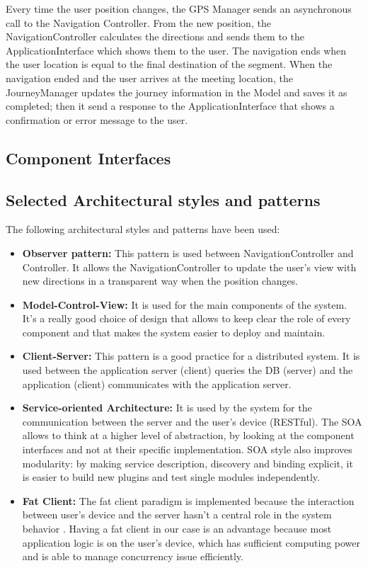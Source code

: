 Every time the user position changes, the GPS Manager sends an asynchronous call to the Navigation Controller.  From the new position, the NavigationController calculates the directions and sends them to the ApplicationInterface which shows them to the user. The navigation ends when the user location is equal to the final destination of the segment.
When the navigation ended and the user arrives at the meeting location, the JourneyManager updates the journey information in the Model and saves it as completed; then it send a response to the ApplicationInterface that shows a confirmation or error message to the user.


\clearpage
\subsection{Component Interfaces}

\clearpage
\subsection{Selected Architectural styles and patterns}
The following architectural styles and patterns have been used:
\begin{itemize}
\item
\textbf{Observer pattern:} This pattern is used between NavigationController and Controller. It allows the NavigationController to update the user’s view with new directions in a transparent way when the position changes.
\item
\textbf{Model-Control-View:} It is used for the main components of the system. It’s a really good choice of design that allows to keep clear the role of every component and that makes the system easier to deploy and maintain.
\item
\textbf{Client-Server:} This pattern is a good practice for a distributed system. It is used between the application server (client) queries the DB (server) and the application (client) communicates with the application server.
\item
\textbf{Service-oriented Architecture:} It is used by the system for the communication between the server and the user’s device (RESTful). The SOA allows to think at a higher level of abstraction, by looking at the component interfaces and not at their specific implementation. SOA style also improves modularity: by making service description, discovery and binding explicit, it is easier to build new plugins and test single modules independently.
\item
\textbf{Fat Client:} The fat client paradigm is implemented because the interaction between user’s device and the server hasn’t a central role in the system behavior . Having a fat client in our case is an advantage because most application logic is on the user’s device, which has sufficient computing power and is able to manage concurrency issue efficiently.
\end{itemize}